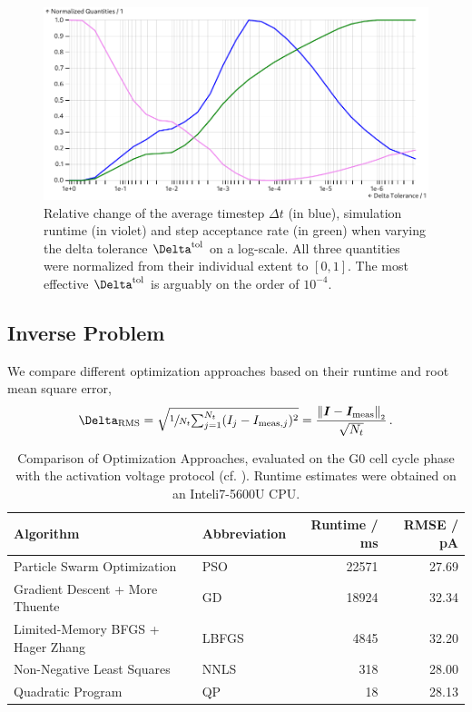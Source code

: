 \begin{figure}
  \includegraphics[width=\columnwidth]{../figures/results/delta-tolerance.pdf}
  \caption{Relative change of the average timestep $\Delta t$ (in blue), simulation runtime (in violet) and step acceptance rate (in green) when varying the delta tolerance $\Delta^{\rm tol}$ on a log-scale. All three quantities were normalized from their individual extent to $[0, 1]$. The most effective $\Delta^{\rm tol}$ is arguably on the order of $10^{-4}$.}
  \label{figure:delta-tolerance}
\end{figure}

\subsection{Inverse Problem}
We compare different optimization approaches based on their runtime and root mean square error,
$$\Delta_{\rm RMS} = \sqrt{\sfrac{1}{N_t} {\textstyle \sum_{j=1}^{N_t}} (I_j - I_{{\rm meas}, j})^2} = \frac{\norm{\vec{I} - \vec{I}_{\rm meas}}}{\sqrt{N_t}}\,.$$

\begin{table}[ht]
  \centering
  \caption{Comparison of Optimization Approaches, evaluated on the G0 cell cycle phase with the activation voltage protocol (cf. ). Runtime estimates were obtained on an Intel\texttrademark i7-5600U CPU.}
  \begin{tabular}{llrr}
    \textbf{Algorithm}                          & \textbf{Abbreviation} & \textbf{Runtime} / ms & \textbf{RMSE} / pA \\
    \midrule
    Particle Swarm Optimization                 & PSO                   & 22571                 & 27.69              \\
    Gradient Descent + More Thuente             & GD                    & 18924                 & 32.34              \\
    Limited-Memory BFGS + Hager Zhang           & LBFGS                 & 4845                  & 32.20              \\
    Non-Negative Least Squares \cite{1997-nnls} & NNLS                  & 318                   & 28.00              \\
    Quadratic Program                           & QP                    & 18                    & 28.13              \\
  \end{tabular}
  \label{table:optimization-comparison}
\end{table}

